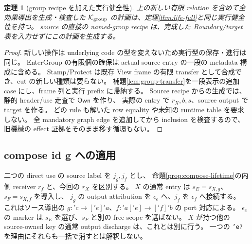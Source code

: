 \documentclass[11pt,a4paper]{article}
\newtheorem{theorem}[definition]{定理}
\newcommand{\Core}{\mathcal K}
\begin{document}
\begin{theorem}[group recipe を加えた実行健全性]
\label{thm:group-safety}
上の新しい有限 relation を含めて全効果導出を生成・検査した
\(\Core_{\rm group}\) の計画は、定理\ref{thm:life-full}と同じ実行健全性を持つ。
source の直接の named-group recipe は、完成した Boundary/target 表を入力せずにこの計画を生成する。
\end{theorem}
\begin{proof}
新しい操作は underlying code の型を変えないため実行型の保存・進行は同じ。
EnterGroup の有限個の確保は actual source entry の一段の metadata 構成に含める。
Stamp/Protect は既存 View frame の有限 transfer として合成でき、cut の新しい種類は要らない。
補題\ref{lem:group-transfer}を一段表示の追加 case にし、frame 列と実行 prefix に帰納する。
Source recipe からの生成では、静的 header/use 走査で \(\mathsf{Own}\) を作り、
実際の entry で \(r_X,b,s\)、source output で target を作る。
どの rule も解いた row equality や未知の runtime table を要求しない。
全 mandatory graph edge を追加してから inclusion を検査するので、
旧機械の effect 証拠をそのまま移す循環もない。
\end{proof}

\subsection{compose id g への適用}

二つの direct use の source label を \(j_g,j_f\) とし、
命題\ref{prop:compose-lifetime}の内側 receiver \(r_f\) と、今回の \(r_X\) を区別する。
\(X\) の通常 entry は \(s_E=s_{X,g}\)、\(s_F=s_{X,f}\) を導入し、
\(j_g\) の output attribution を \(\epsilon_e\) へ、\(j_f\) を \(\epsilon_f\) へ接続する。
これはソース導出の \(g:'c\to['e]'a\)、\(f:'a['e]\to['f]'b\) の port 対応による。
\(\epsilon_e\) の marker は \(s_E\) を選び、\(s_F\) と別の free scope を選ばない。
\(X\) が持つ他の source-owned key の通常 output discharge は、これとは別に行う。
一つの \texttt{'e?} を理由にそれらも一括で消すとは解釈しない。
\end{document}
